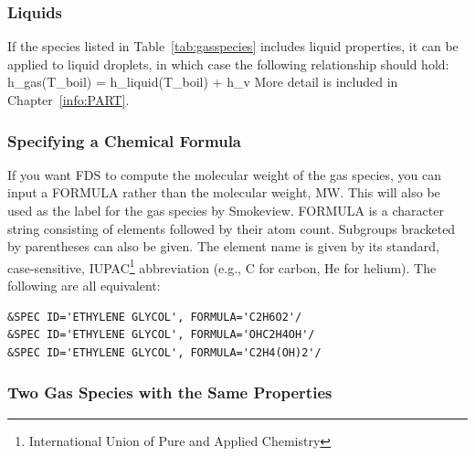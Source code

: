 \documentclass[11pt]{book}
\begin{document}
\subsubsection{Liquids}

If the species listed in Table~\ref{tab:gasspecies} includes liquid properties, it can be applied to liquid droplets, in which case the following relationship should hold:
\be
   h_{\rm gas}(T_{\rm boil}) = h_{\rm liquid}(T_{\rm boil}) + h_{\rm v}
\ee
More detail is included in Chapter~\ref{info:PART}.


\subsubsection{Specifying a Chemical Formula}
\label{info:FORMULA}

If you want FDS to compute the molecular weight of the gas species, you can input a {\ct FORMULA} rather than the molecular weight, {\ct MW}.
This will also be used as the label for the gas species by Smokeview.  {\ct FORMULA} is a character string consisting of elements followed by their atom count.
Subgroups bracketed by parentheses can also be given.  The element name is given by its standard, case-sensitive, IUPAC\footnote{International Union of Pure
and Applied Chemistry} abbreviation (e.g., C for carbon, He for helium).
The following are all equivalent:

\begin{lstlisting}
&SPEC ID='ETHYLENE GLYCOL', FORMULA='C2H6O2'/
&SPEC ID='ETHYLENE GLYCOL', FORMULA='OHC2H4OH'/
&SPEC ID='ETHYLENE GLYCOL', FORMULA='C2H4(OH)2'/
\end{lstlisting}


\subsubsection{Two Gas Species with the Same Properties}
\label{info:SPEC_advanced}
\end{document}

